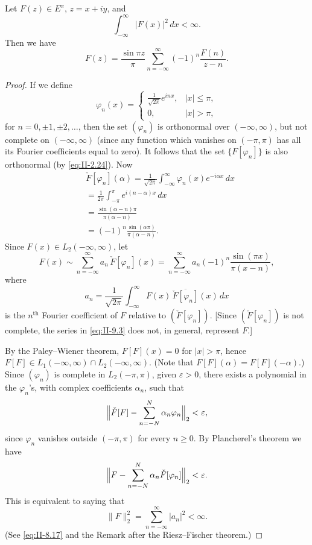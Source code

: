 \begin{theorem}[Hardy]\label{thm:II-11}
Let $F(z)\in E^{\pi}$, $z=x+iy$, and
\begin{equation}\tag{9.1}\label{eq:II-9.1}
\int_{-\infty}^{\infty}|F(x)|^{2}\,dx<\infty.
\end{equation}
Then we have
\begin{equation}\tag{9.2}\label{eq:II-9.2}
F(z)=\frac{\sin\pi z}{\pi}\sum_{n=-\infty}^{\infty}(-1)^{n}\frac{F(n)}{z-n}.
\end{equation}
\end{theorem}
\begin{proof}
If we define
\[
\varphi_{n}(x)=
\begin{cases}
\frac{1}{\sqrt{2\pi}}e^{inx}, & |x|\le\pi,\\
0, & |x|>\pi,
\end{cases}
\]
for $n=0,\pm1,\pm2,\dots$, then the set $(\varphi_{n})$ is orthonormal over $(-\infty,\infty)$, but not complete on $(-\infty,\infty)$ (since any function which vanishes on $(-\pi,\pi)$ has all its Fourier coefficients equal to zero). It follows that the set $\{F[\varphi_{n}]\}$ is also orthonormal (by \eqref{eq:II-2.24}). Now
\[
\begin{aligned}
&\check F[\varphi_{n}](\alpha) = \frac{1}{\sqrt{2\pi}}\int_{-\infty}^{\infty}\varphi_{n}(x)e^{-i\alpha x}\,dx\\
&= \frac{1}{2\pi}\int_{-\pi}^{\pi}e^{i(n-\alpha)x}\,dx\\
&= \frac{\sin(\alpha-n)\pi}{\pi(\alpha-n)}\\
&= (-1)^{n}\frac{\sin(\alpha\pi)}{\pi(\alpha-n)}.
\end{aligned}
\]
Since $F(x)\in L_{2}(-\infty,\infty)$, let
\begin{equation}\tag{9.3}\label{eq:II-9.3}
F(x)\sim\sum_{n=-\infty}^{\infty}a_{n}\,\check F[\varphi_{n}](x)
=\sum_{n=-\infty}^{\infty}a_{n}(-1)^{n}\frac{\sin(\pi x)}{\pi(x-n)},
\end{equation}
where
\[
a_{n}=\frac{1}{\sqrt{2\pi}}\int_{-\infty}^{\infty}F(x)\,\overline{\check F[\varphi_{n}]}(x)\,dx
\]
is the $n^{\text{th}}$ Fourier coefficient of $F$ relative to $(\check F[\varphi_{n}])$. [Since $(\check F[\varphi_{n}])$ is not complete, the series in \eqref{eq:II-9.3} does not, in general, represent $F$.]

By the Paley--Wiener theorem, $F[F](x)=0$ for $|x|>\pi$, hence $F[F]\in L_{1}(-\infty,\infty)\cap L_{2}(-\infty,\infty)$. (Note that $F[F](\alpha)=F[F](-\alpha)$.) Since $(\varphi_{n})$ is complete in $L_{2}(-\pi,\pi)$, given $\varepsilon>0$, there exists a polynomial in the $\varphi_{n}$'s, with complex coefficients $\alpha_{n}$, such that
\[
\Bigl\|\check F[F]-\sum_{n=-N}^{N}\alpha_{n}\varphi_{n}\Bigr\|_{2}<\varepsilon,
\]
since $\varphi_{n}$ vanishes outside $(-\pi,\pi)$ for every $n\ge 0$. By Plancherel's theorem we have
\[
\Bigl\|F-\sum_{n=-N}^{N}\alpha_{n}\check F[\varphi_{n}]\Bigr\|_{2}<\varepsilon.
\]
This is equivalent to saying that
\begin{equation}\tag{9.4}\label{eq:II-9.4}
\|F\|_{2}^{2}=\sum_{n=-\infty}^{\infty}|a_{n}|^{2}<\infty.
\end{equation}
(See \eqref{eq:II-8.17} and the Remark after the Riesz--Fischer theorem.)


\end{proof}

